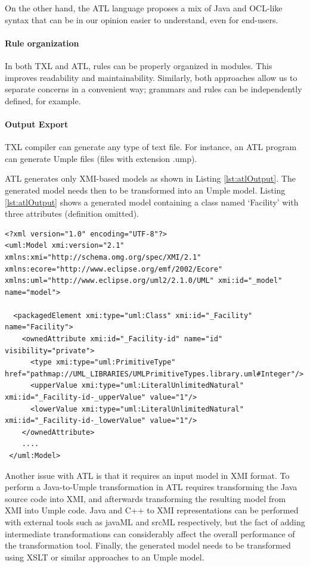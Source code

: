 On the other hand, the ATL language proposes a mix of Java and OCL-like syntax that can be in our opinion easier to understand, even for end-users. 

\paragraph*{Rule organization}

In both TXL and ATL, rules can be properly organized in modules. This improves readability and maintainability.
Similarly, both approaches allow us to separate concerns in a convenient way; grammars and rules can be independently defined, for example.

\paragraph*{Output Export} 

TXL compiler can generate any type of text file. For instance, an ATL program can generate Umple files (files with extension .ump).

ATL generates only XMI-based models as shown in Listing \ref{lst:atlOutput}. The generated model needs then to be transformed into an Umple model. Listing \ref{lst:atlOutput} shows a generated model containing a class named `Facility' with three attributes (definition omitted).

\begin{lstlisting}[style=umplePlain, label=lst:atlOutput, caption=Model Generated by ATL] 
<?xml version="1.0" encoding="UTF-8"?>
<uml:Model xmi:version="2.1" xmlns:xmi="http://schema.omg.org/spec/XMI/2.1" xmlns:ecore="http://www.eclipse.org/emf/2002/Ecore" xmlns:uml="http://www.eclipse.org/uml2/2.1.0/UML" xmi:id="_model" name="model">

  <packagedElement xmi:type="uml:Class" xmi:id="_Facility" name="Facility">
    <ownedAttribute xmi:id="_Facility-id" name="id" visibility="private">
      <type xmi:type="uml:PrimitiveType" href="pathmap://UML_LIBRARIES/UMLPrimitiveTypes.library.uml#Integer"/>
      <upperValue xmi:type="uml:LiteralUnlimitedNatural" xmi:id="_Facility-id-_upperValue" value="1"/>
      <lowerValue xmi:type="uml:LiteralUnlimitedNatural" xmi:id="_Facility-id-_lowerValue" value="1"/>
    </ownedAttribute>
    ....
 </uml:Model>     
\end{lstlisting}

Another issue with ATL is that it requires an input model in  XMI format. To perform a Java-to-Umple transformation in ATL requires transforming the Java source code into XMI, and afterwards transforming the resulting model from XMI into Umple code. Java and C++ to XMI representations can be performed with external tools such as javaML and srcML respectively, but the fact of adding intermediate transformations can considerably affect the overall performance of the transformation tool. Finally, the generated model needs to be transformed using XSLT or similar approaches to an Umple model.

